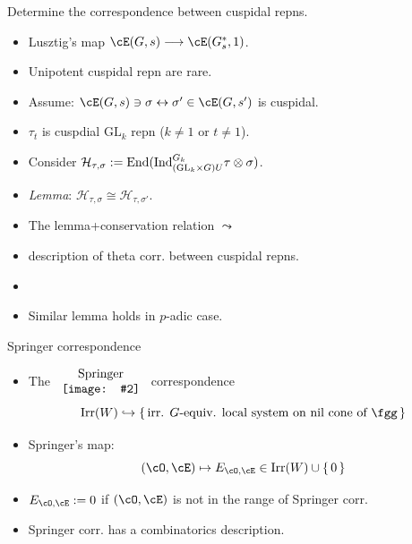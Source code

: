 \documentclass[t,mathserif,11pt,usenames,dvipsnames]{beamer}
\theoremstyle{plain}
\theoremstyle{definition}
\def\GL{\mathrm{GL}}
\def\End{{\rm End}}
\def\Ind{{\rm Ind}}
\def\Irr{{\mathrm{Irr}}}
\def\blue{\color{blue}}
\let\oldemph\emph
\def\emph#1{\oldemph{\blue #1}}
\def\hhgraph#1#2#3{\ensuremath{\begin{array}{c}\text{#3}\\
        \hbox{\texttt{[image: \#2]}}
        \end{array}}}
\def\cH{\mathcal{H}}
\begin{document}
\begin{frame}{Determine the correspondence between cuspidal repns.}
  \begin{itemize}
    \item Lusztig's map
          $\cE(G,s)\longrightarrow \cE(G^{*}_{s},1)$.
    \item Unipotent cuspidal repn are rare. \pause
    \item Assume: $\cE(G,s) \ni\sigma\leftrightarrow \sigma'\in \cE(G,s')$ is
          cuspidal.
    \item $\tau_{t}$ is cuspdial $\GL_{k}$ repn ($k\neq 1$ or $t\neq 1$).
    \item Consider
          $\cH_{\tau,\sigma}:= \End(\Ind_{(\GL_{k}\times G)U}^{G_{k}} \tau \otimes \sigma)$. \pause
    \item \emph{Lemma}: $\cH_{\tau,\sigma}\cong \cH_{\tau,\sigma'}$.\pause
    \item The lemma+conservation relation $\leadsto$ 
    \item[]\hspace{1em} description of theta
          corr. between cuspidal repns.
    \item[]
    \item Similar lemma holds in $p$-adic case.
  \end{itemize}
\end{frame}

\begin{frame}{Springer correspondence}
\begin{itemize}
\item The \hhgraph{0.15\textwidth}{Springer}{Springer} correspondence
\[
\Irr(W)\hookrightarrow \set{\text{irr. $G$-equiv. local system on nil cone of }\fgg}
\]
\item Springer's map: 
\[ (\cO, \cE)\mapsto E_{\cO,\cE}\in \Irr(W)\cup \set{0} 
\]
\item[] $E_{\cO,\cE}:= 0 $ if $(\cO,\cE)$ is not in the range of Springer corr.  
\item Springer corr. has a combinatorics description.  
\end{itemize}
\end{frame}
\end{document}
